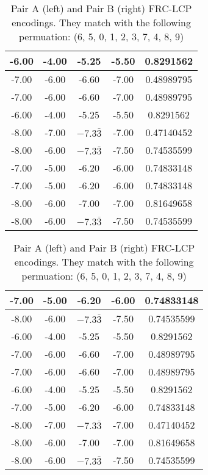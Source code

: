 \begin{table}[H]
\centering
\footnotesize
\begin{tabular}{|c|c|c|c|c|}
    \hline
    -6.00 & -4.00 & -5.25 & -5.50 & 0.8291562 \\ \hline
    -7.00 & -6.00 & -6.60 & -7.00 & 0.48989795 \\ \hline
    -7.00 & -6.00 & -6.60 & -7.00 & 0.48989795 \\ \hline
    -6.00 & -4.00 & -5.25 & -5.50 & 0.8291562 \\ \hline
    -8.00 & -7.00 & $-7.3\overline{3}$ & -7.00 & 0.47140452 \\ \hline
    -8.00 & -6.00 & $-7.3\overline{3}$ & -7.50 & 0.74535599 \\ \hline
    -7.00 & -5.00 & -6.20 & -6.00 & 0.74833148 \\ \hline
    -7.00 & -5.00 & -6.20 & -6.00 & 0.74833148 \\ \hline
    -8.00 & -6.00 & -7.00 & -7.00 & 0.81649658 \\ \hline
    -8.00 & -6.00 & $-7.3\overline{3}$ & -7.50 & 0.74535599 \\ \hline
\end{tabular}
\begin{tabular}{|c|c|c|c|c|}
    \hline
    -7.00 & -5.00 & -6.20 & -6.00 & 0.74833148 \\ \hline
    -8.00 & -6.00 & $-7.3\overline{3}$ & -7.50 & 0.74535599 \\ \hline
    -6.00 & -4.00 & -5.25 & -5.50 &  0.8291562  \\ \hline
    -7.00 & -6.00 & -6.60 & -7.00 & 0.48989795 \\ \hline
    -7.00 & -6.00 & -6.60 & -7.00 & 0.48989795 \\ \hline
    -6.00 & -4.00 & -5.25 & -5.50 & 0.8291562 \\ \hline
    -7.00 & -5.00 & -6.20 & -6.00 & 0.74833148 \\ \hline
    -8.00 & -7.00 & $-7.3\overline{3}$ & -7.00 & 0.47140452 \\ \hline
    -8.00 & -6.00 & -7.00 & -7.00 & 0.81649658 \\ \hline
    -8.00 & -6.00 & $-7.3\overline{3}$ & -7.50 & 0.74535599 \\ \hline
\end{tabular}
\caption{Pair A (left) and Pair B (right) FRC-LCP encodings. They match with the following permuation: (6, 5, 0, 1, 2, 3, 7, 4, 8, 9)}
\label{tab:sidetables-g-frc}
\end{table}

